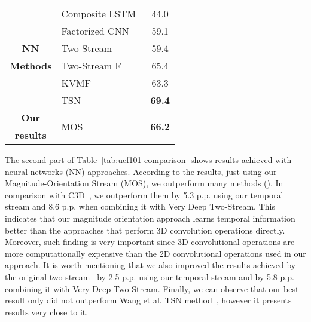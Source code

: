 \documentclass[10pt,conference]{IEEEtran}
\begin{document}
\begin{table}[!htb]
\begin{small}
\begin{tabular}{clc}
			& Composite LSTM~\cite{Srivastava:2015}  & \multicolumn{1}{c}{44.0} \\
			& Factorized CNN~\cite{Sun:2015} & \multicolumn{1}{c}{59.1} \\
			\multirow{1}{*}{\textbf{NN}} & Two-Stream~\cite{Simonyan:2014}  & \multicolumn{1}{c}{59.4} \\ 
			\multirow{1}{*}{\textbf{Methods}} & Two-Stream F~\cite{Feichtenhofer:2016}  & \multicolumn{1}{c}{65.4} \\
			& KVMF~\cite{Zhu:2016} & \multicolumn{1}{c}{63.3} \\
			& TSN~\cite{Wang:2016} & \multicolumn{1}{c}{\textbf{69.4}} \\
			\midrule
			\multirow{1}{*}{\textbf{Our}} &\multirow{2}{*}{MOS} & \multicolumn{1}{c}{\multirow{2}{*}{\textbf{66.2}}} \\
			\multirow{1}{*}{\textbf{results}} & & \\
			\bottomrule
		\end{tabular}
		\label{tab:hmdb51-comparison}
	\end{small}
\end{table}

The second part of Table~\ref{tab:ucf101-comparison} shows results achieved with neural networks (NN) approaches. 
According to the results, just using our Magnitude-Orientation Stream (MOS), we outperform many methods (\cite{Karpathy:2014, Srivastava:2015, Tran:2015, Sun:2015, Simonyan:2014}). In comparison with C3D~\cite{Tran:2015}, we outperform them by 5.3 p.p. using our temporal stream and 8.6 p.p. when combining it with Very Deep Two-Stream. This indicates that our magnitude orientation approach learns temporal information better than the approaches that perform 3D convolution operations directly. Moreover, such finding is very important since 3D convolutional operations are more computationally expensive than the 2D convolutional operations used in our approach. %
It is worth mentioning that we also improved the results achieved by the original two-stream~\cite{Simonyan:2014} by 2.5 p.p. using our temporal stream and by 5.8 p.p. combining it with Very Deep Two-Stream. Finally, we can observe that our best result only did not outperform Wang et al. TSN method~\cite{Wang:2016}, however it presents results very close to it.
\end{document}
